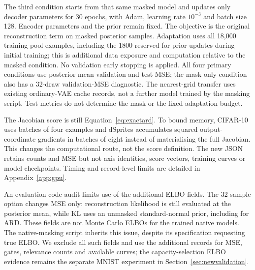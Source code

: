 The third condition starts from that same masked model and updates only
decoder parameters for 30 epochs, with Adam, learning rate $10^{-3}$ and
batch size 128. Encoder parameters and the prior remain fixed.
The objective is the original reconstruction term on masked posterior
samples. Adaptation uses all 18,000 training-pool examples, including
the 1800 reserved for prior updates during initial training; this is
additional data exposure and computation relative to the masked
condition. No validation early stopping is applied. All four primary
conditions use posterior-mean validation and test MSE; the mask-only
condition also has a 32-draw validation-MSE diagnostic. The nearest-grid
transfer uses existing ordinary-VAE cache records, not a further model
trained by the masking script. Test metrics do not determine the mask
or the fixed adaptation budget.

The Jacobian score is still Equation~\eqref{eq:exactard}. To bound memory,
CIFAR-10 uses batches of four examples and dSprites accumulates squared
output-coordinate gradients in batches of eight instead of materialising
the full Jacobian. This changes the computational route, not the score
definition. The new JSON retains counts and MSE but not axis identities,
score vectors, training curves or model checkpoints. Timing and
record-level limits are detailed in Appendix~\ref{app:gpu}.

An evaluation-code audit limits use of the additional ELBO fields.
The 32-sample option changes MSE only: reconstruction likelihood is still
evaluated at the posterior mean, while KL uses an unmasked standard-normal
prior, including for ARD. These fields are not Monte Carlo ELBOs for the
trained native models. The native-masking script inherits this issue,
despite its specification requesting true ELBO. We exclude all such
fields and use the additional records for MSE, gates, relevance counts
and available curves; the capacity-selection ELBO evidence
remains the separate MNIST experiment in Section~\ref{sec:newvalidation}.
